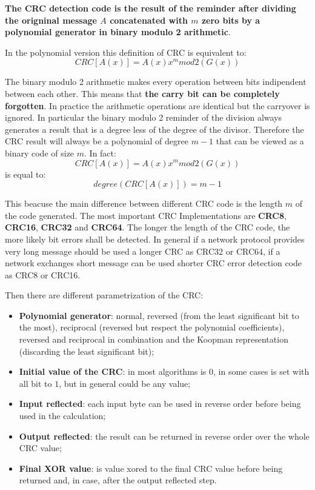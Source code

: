 \documentclass[fleqn]{IEEEtran}
\begin{document}
\textbf{The CRC detection code is the result of the reminder after dividing the 
origninal message $A$ concatenated with $m$ zero bits by a polynomial generator
in binary modulo 2 arithmetic}.

In the polynomial version this definition of CRC is equivalent to:
\[
   CRC[A(x)]=A(x)x^{m}mod2(G(x))
\]

The binary modulo 2 arithmetic makes every operation between bits indipendent
between each other. This means that \textbf{the carry bit can be completely 
forgotten}. In practice the arithmetic operations are identical but the carryover 
is ignored. In particular the binary modulo 2 reminder of the division always 
generates a result that is a degree less of the degree of the divisor. Therefore
the CRC result will always be a polynomial of degree $m-1$ that can be viewed as
a binary code of size $m$. In fact:
\[
   CRC[A(x)]=A(x)x^{m}mod2(G(x))
\]
is equal to:
\[
   degree(CRC[A(x)])=m-1
\]

This beacuse the main difference between different CRC code is the length $m$ of
the code generated. The most important CRC Implementations are \textbf{CRC8}, 
\textbf{CRC16}, \textbf{CRC32} and \textbf{CRC64}. The longer the length of the 
CRC code, the more likely bit errors shall be detected. 
In general if a network protocol provides very long message should be used a 
longer CRC as CRC32 or CRC64, if a network exchanges short message can be used 
shorter CRC error detection code as CRC8 or CRC16.

Then there are different parametrization of the CRC:
\begin{itemize}
   \item \textbf{Polynomial generator}: normal, reversed (from the least 
   significant bit to the most), reciprocal (reversed but respect the polynomial 
   coefficients), reversed and reciprocal in combination and the Koopman
   representation (discarding the least significant bit);

   \item \textbf{Initial value of the CRC}: in most algorithms is $0$, in some 
   cases is set with all bit to $1$, but in general could be any value;

   \item \textbf{Input reflected}: each input byte can be used in reverse order 
   before being used in the calculation;

   \item \textbf{Output reflected}: the result can be returned in reverse order 
   over the whole CRC value;

   \item \textbf{Final XOR value}: is value xored to the final CRC value before 
   being returned and, in case, after the output reflected step.
\end{itemize}
\end{document}
